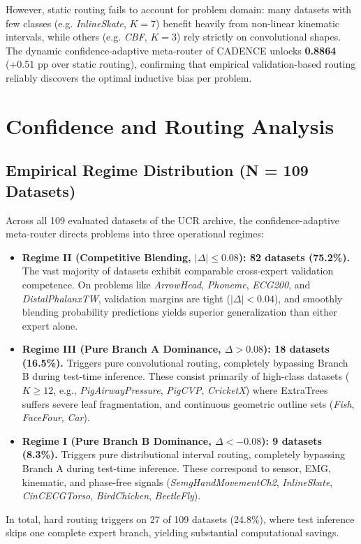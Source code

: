 \documentclass[journal,twocolumn]{article}
\begin{document}
However, static routing fails to account for problem domain: many datasets with few classes (e.g. \textit{InlineSkate}, $K=7$) benefit heavily from non-linear kinematic intervals, while others (e.g. \textit{CBF}, $K=3$) rely strictly on convolutional shapes. The dynamic confidence-adaptive meta-router of CADENCE unlocks \textbf{0.8864} (+0.51 pp over static routing), confirming that empirical validation-based routing reliably discovers the optimal inductive bias per problem.

\section{Confidence and Routing Analysis}

\subsection{Empirical Regime Distribution (N = 109 Datasets)}
Across all 109 evaluated datasets of the UCR archive, the confidence-adaptive meta-router directs problems into three operational regimes:
\begin{itemize}
    \item \textbf{Regime II (Competitive Blending, $|\Delta| \le 0.08$): 82 datasets (75.2\%).} The vast majority of datasets exhibit comparable cross-expert validation competence. On problems like \textit{ArrowHead}, \textit{Phoneme}, \textit{ECG200}, and \textit{DistalPhalanxTW}, validation margins are tight ($|\Delta| < 0.04$), and smoothly blending probability predictions yields superior generalization than either expert alone.
    \item \textbf{Regime III (Pure Branch A Dominance, $\Delta > 0.08$): 18 datasets (16.5\%).} Triggers pure convolutional routing, completely bypassing Branch B during test-time inference. These consist primarily of high-class datasets ($K \ge 12$, e.g., \textit{PigAirwayPressure}, \textit{PigCVP}, \textit{CricketX}) where ExtraTrees suffers severe leaf fragmentation, and continuous geometric outline sets (\textit{Fish}, \textit{FaceFour}, \textit{Car}).
    \item \textbf{Regime I (Pure Branch B Dominance, $\Delta < -0.08$): 9 datasets (8.3\%).} Triggers pure distributional interval routing, completely bypassing Branch A during test-time inference. These correspond to sensor, EMG, kinematic, and phase-free signals (\textit{SemgHandMovementCh2}, \textit{InlineSkate}, \textit{CinCECGTorso}, \textit{BirdChicken}, \textit{BeetleFly}).
\end{itemize}
In total, hard routing triggers on 27 of 109 datasets (24.8\%), where test inference skips one complete expert branch, yielding substantial computational savings.
\end{document}
